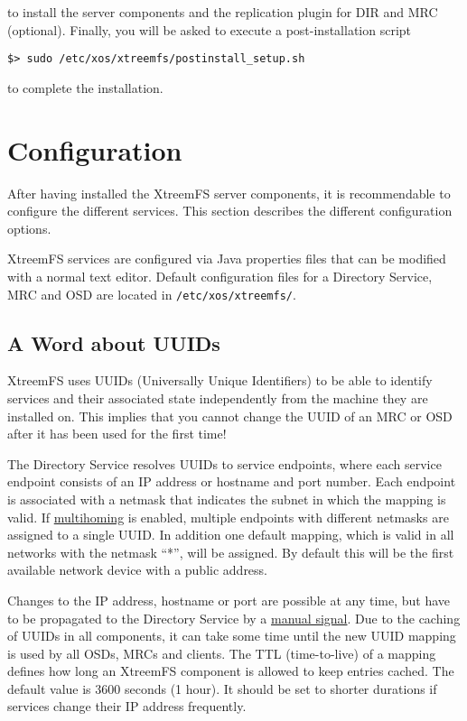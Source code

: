 \documentclass[a4paper,10pt]{book}
\begin{document}
to install the server components and the replication plugin for DIR and MRC (optional). Finally, you will be asked to execute a post-installation script

\begin{verbatim}
$> sudo /etc/xos/xtreemfs/postinstall_setup.sh
\end{verbatim}

to complete the installation.

\section{Configuration}
\label{sec:service_config}

After having installed the XtreemFS server components, it is recommendable to configure the different services. This section describes the different configuration options.

XtreemFS services are configured via Java properties files that can be modified with a normal text editor. Default configuration files for a Directory Service, MRC and OSD are located in \texttt{/etc/xos/xtreemfs/}.

\subsection{A Word about UUIDs}

XtreemFS uses UUIDs (Universally Unique Identifiers) to be able to identify services and their associated state independently from the machine they are installed on. This implies that you cannot change the UUID of an MRC or OSD after it has been used for the first time!

The Directory Service resolves UUIDs to service endpoints, where each service endpoint consists of an IP address or hostname and port number. Each endpoint is associated with a netmask that indicates the subnet in which the mapping is valid. If \hyperref[option:multihoming.enabled]{multihoming} is enabled, multiple endpoints with different netmasks are assigned to a single UUID. In addition one default mapping, which is valid in all networks with the netmask ``*'', will be assigned. By default this will be the first available network device with a public address.

Changes to the IP address, hostname or port are possible at any time, but have to be propagated to the Directory Service by a \hyperref[option:multihoming.renewalsignal]{manual signal}. Due to the caching of UUIDs in all components, it can take some time until the new UUID mapping is used by all OSDs, MRCs and clients. The TTL (time-to-live) of a mapping defines how long an XtreemFS component is allowed to keep entries cached. The default value is 3600 seconds (1 hour). It should be set to shorter durations if services change their IP address frequently.
\end{document}
